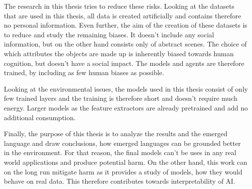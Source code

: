 The research in this thesis tries to reduce these risks.
Looking at the datasets that are used in this thesis, all data is created artificially and contains therefore no personal information.
Even further, the aim of the creation of these datasets is to reduce and study the remaining biases.
It doesn't include any social information, but on the other hand consists only of abstract scenes.
The choice of which attributes the objects are made up is inherently biased towards human cognition, but doesn't have a social impact.
The models and agents are therefore trained, by including as few human biases as possible.

Looking at the environmental issues, the models used in this thesis consist of only few trained layers and the training is therefore short and doesn't require much energy.
Larger models as the feature extractors are already pretrained and add no additional consumption.

Finally, the purpose of this thesis is to analyze the results and the emerged language and draw conclusions, how emerged languages can be grounded better in the environment.
For that reason, the final models can't be uses in any real world applications and produce potential harm.
On the other hand, this work can on the long run mitigate harm as it provides a study of models, how they would behave on real data.
This therefore contributes towards interpretability of AI.
